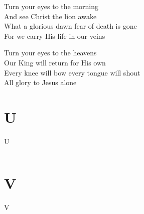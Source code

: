 \documentclass{beamer}
\begin{document}
{\begin{frame}{}
\end{frame}

\hypertarget{Turn your eyes upon Jesus[]3}{}
\begin{frame}{}
\fontsize{ 15 }{ 19 }\selectfont

Turn your eyes to the morning\\ 
And see Christ the lion awake\\ 
What a glorious dawn fear of death is gone\\ 
For we carry His life in our veins 

\end{frame}

\hypertarget{Turn your eyes upon Jesus[]4}{}
\begin{frame}{}
\fontsize{ 15 }{ 19 }\selectfont

Turn your eyes to the heavens\\ 
Our King will return for His own\\ 
Every knee will bow every tongue will shout\\ 
All glory to Jesus alone 

\end{frame}

}
\section{U}

\begin{frame}{U}
\begin{columns}

    


    


\end{columns}

\end{frame}

\section{V}

\begin{frame}{V}
\begin{columns}

    


    


\end{columns}

\end{frame}
\end{document}
